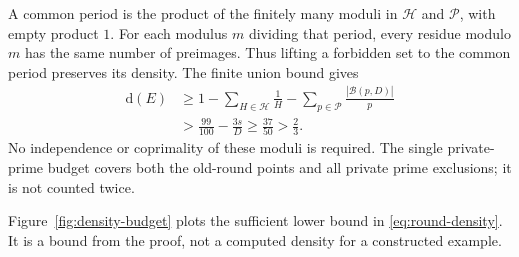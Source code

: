 \documentclass[11pt,reqno]{amsart}
\theoremstyle{definition}
\theoremstyle{remark}
\numberwithin{equation}{section}
\newcommand{\dens}{\mathrm d}
\begin{document}
A common period is the product of the finitely many moduli in
$\mathcal H$ and $\mathcal P$, with empty product $1$. For each modulus
$m$ dividing that period, every residue modulo $m$ has the same number
of preimages. Thus lifting a forbidden set to the common period
preserves its density. The finite union bound gives
\begin{equation}\label{eq:round-density}
 \begin{split}
 \dens(E)&\geq1-\sum_{H\in\mathcal H}\frac1H
                 -\sum_{p\in\mathcal P}\frac{|\mathcal B(p,D)|}{p}\\
         &>\frac{99}{100}-\frac{3s}{D}
          \geq\frac{37}{50}>\frac23.
 \end{split}
\end{equation}
No independence or coprimality of these moduli is required. The single
private-prime budget covers both the old-round points and all private
prime exclusions; it is not counted twice.

Figure~\ref{fig:density-budget} plots the sufficient lower bound in
\eqref{eq:round-density}. It is a bound from the proof, not a computed
density for a constructed example.
\end{document}
